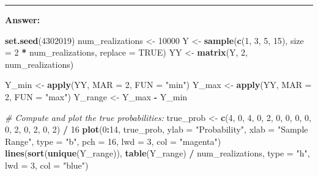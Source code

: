 \documentclass[]{article}
\newenvironment{Shaded}{\begin{snugshade}}{\end{snugshade}}
\newcommand{\KeywordTok}[1]{\textcolor[rgb]{0.13,0.29,0.53}{\textbf{#1}}}
\newcommand{\DataTypeTok}[1]{\textcolor[rgb]{0.13,0.29,0.53}{#1}}
\newcommand{\DecValTok}[1]{\textcolor[rgb]{0.00,0.00,0.81}{#1}}
\newcommand{\StringTok}[1]{\textcolor[rgb]{0.31,0.60,0.02}{#1}}
\newcommand{\CommentTok}[1]{\textcolor[rgb]{0.56,0.35,0.01}{\textit{#1}}}
\newcommand{\OtherTok}[1]{\textcolor[rgb]{0.56,0.35,0.01}{#1}}
\newcommand{\OperatorTok}[1]{\textcolor[rgb]{0.81,0.36,0.00}{\textbf{#1}}}
\newcommand{\NormalTok}[1]{#1}
\begin{document}
\begin{center}\rule{0.5\linewidth}{\linethickness}\end{center}

\textbf{Answer:}

\begin{Shaded}
\begin{Highlighting}[]
\KeywordTok{set.seed}\NormalTok{(}\DecValTok{4302019}\NormalTok{)}
\NormalTok{num_realizations <-}\StringTok{ }\DecValTok{10000}
\NormalTok{Y <-}\StringTok{ }\KeywordTok{sample}\NormalTok{(}\KeywordTok{c}\NormalTok{(}\DecValTok{1}\NormalTok{, }\DecValTok{3}\NormalTok{, }\DecValTok{5}\NormalTok{, }\DecValTok{15}\NormalTok{), }\DataTypeTok{size =} \DecValTok{2} \OperatorTok{*}\StringTok{ }\NormalTok{num_realizations, }\DataTypeTok{replace =} \OtherTok{TRUE}\NormalTok{)}
\NormalTok{YY <-}\StringTok{ }\KeywordTok{matrix}\NormalTok{(Y, }\DecValTok{2}\NormalTok{, num_realizations)}


\NormalTok{Y_min <-}\StringTok{ }\KeywordTok{apply}\NormalTok{(YY, }\DataTypeTok{MAR =} \DecValTok{2}\NormalTok{, }\DataTypeTok{FUN =} \StringTok{"min"}\NormalTok{)}
\NormalTok{Y_max <-}\StringTok{ }\KeywordTok{apply}\NormalTok{(YY, }\DataTypeTok{MAR =} \DecValTok{2}\NormalTok{, }\DataTypeTok{FUN =} \StringTok{"max"}\NormalTok{)}
\NormalTok{Y_range <-}\StringTok{ }\NormalTok{Y_max }\OperatorTok{-}\StringTok{ }\NormalTok{Y_min}

\CommentTok{# Compute and plot the true probabilities: }
\NormalTok{true_prob <-}\StringTok{ }\KeywordTok{c}\NormalTok{(}\DecValTok{4}\NormalTok{, }\DecValTok{0}\NormalTok{, }\DecValTok{4}\NormalTok{, }\DecValTok{0}\NormalTok{, }\DecValTok{2}\NormalTok{, }\DecValTok{0}\NormalTok{, }\DecValTok{0}\NormalTok{, }\DecValTok{0}\NormalTok{, }\DecValTok{0}\NormalTok{, }\DecValTok{0}\NormalTok{, }\DecValTok{2}\NormalTok{, }\DecValTok{0}\NormalTok{, }\DecValTok{2}\NormalTok{, }\DecValTok{0}\NormalTok{, }\DecValTok{2}\NormalTok{) }\OperatorTok{/}\StringTok{ }\DecValTok{16}
\KeywordTok{plot}\NormalTok{(}\DecValTok{0}\OperatorTok{:}\DecValTok{14}\NormalTok{, true_prob, }
     \DataTypeTok{ylab =} \StringTok{"Probability"}\NormalTok{,}
     \DataTypeTok{xlab =} \StringTok{"Sample Range"}\NormalTok{,}
     \DataTypeTok{type =} \StringTok{"b"}\NormalTok{, }\DataTypeTok{pch =} \DecValTok{16}\NormalTok{, }\DataTypeTok{lwd =} \DecValTok{3}\NormalTok{, }\DataTypeTok{col =} \StringTok{"magenta"}\NormalTok{)}
\KeywordTok{lines}\NormalTok{(}\KeywordTok{sort}\NormalTok{(}\KeywordTok{unique}\NormalTok{(Y_range)), }\KeywordTok{table}\NormalTok{(Y_range) }\OperatorTok{/}\StringTok{ }\NormalTok{num_realizations, }\DataTypeTok{type =} \StringTok{"h"}\NormalTok{, }\DataTypeTok{lwd =} \DecValTok{3}\NormalTok{, }\DataTypeTok{col =} \StringTok{"blue"}\NormalTok{)}
\end{Highlighting}
\end{Shaded}
\end{document}
